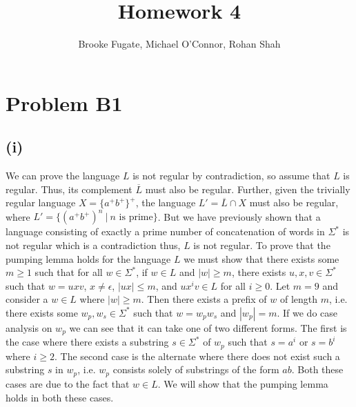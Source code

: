 \documentclass[12pt]{article}
\begin{document}
\pagestyle{plain}
\titleformat{\subsection}[runin]
  {\normalfont\large\bfseries}{\thesubsection}{1em}{}

\title{Homework 4}
\author{Brooke Fugate, Michael O'Connor, Rohan Shah}
\date{}

\maketitle

\section*{Problem B1}
\subsection*{(i)}
We can prove the language $L$ is not regular by contradiction, so assume that
$L$ is regular. Thus, its complement $\overline{L}$ must also be regular.
Further, given the trivially regular language $X = \{a^+b^+\}^+$, the language
$L' = \overline{L} \cap X$ must also be regular, where
$L' = \{(a^+b^+)^n\ |\ n \text{ is prime}\}$. But we have previously
shown that a language consisting of exactly a prime number of concatenation
of words in $\Sigma^*$ is not regular which is a contradiction thus, $L$ is not
regular.
\medskip
\newline
To prove that the pumping lemma holds for the language $L$ we must show that
there exists some $m \ge 1$ such that for all $w \in \Sigma^*$, if $w \in L$
and $|w| \ge m$, there exists $u,x,v \in \Sigma^*$ such that $w = uxv$,
$x \neq \epsilon$, $|ux| \le m$, and $ux^iv \in L$ for all $i \ge 0$. Let
$m = 9$ and consider a $w \in L$ where $|w| \ge m$. Then there exists a
prefix of $w$ of length $m$, i.e. there exists some $w_p,w_s \in \Sigma^*$
such that $w = w_pw_s$ and $|w_p| = m$. If we do case analysis on
$w_p$ we can see that it can take one of two different forms. The first is the
case where there exists a substring $s \in \Sigma^*$ of $w_p$ such that
$s = a^i$ or $s = b^i$ where $i \ge 2$. The second case is the alternate where
there does not exist such a substring $s$ in $w_p$, i.e. $w_p$ consists solely
of substrings of the form $ab$. Both these cases are due to the fact that
$w \in L$. We will show that the pumping lemma holds in both these cases.
\medskip
\newline
\end{document}
